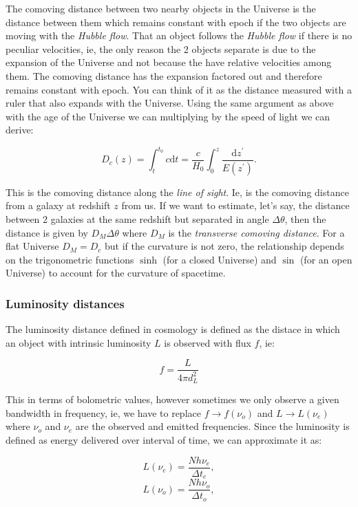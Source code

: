 \documentclass[
  letterpaper,
  DIV=11,
  numbers=noendperiod]{scrreprt}
\begin{document}
The comoving distance between two nearby objects in the Universe is the
distance between them which remains constant with epoch if the two
objects are moving with the \emph{Hubble flow}. That an object follows
the \emph{Hubble flow} if there is no peculiar velocities, ie, the only
reason the 2 objects separate is due to the expansion of the Universe
and not because the have relative velocities among them. The comoving
distance has the expansion factored out and therefore remains constant
with epoch. You can think of it as the distance measured with a ruler
that also expands with the Universe. Using the same argument as above
with the age of the Universe we can multiplying by the speed of light we
can derive:

\[D_c(z) = \int_{t}^{t_0} c\mathrm{ d} t = \frac{c}{H_0} \int^z_0 \frac{\mathrm{ d}z^\prime}{E(z^\prime)}.\]

This is the comoving distance along the \emph{line of sight}. Ie, is the
comoving distance from a galaxy at redshift \(z\) from us. If we want to
estimate, let's say, the distance between 2 galaxies at the same
redshift but separated in angle \(\Delta \theta\), then the distance is
given by \(D_M \Delta \theta\) where \(D_M\) is the \emph{transverse
comoving distance}. For a flat Universe \(D_M = D_c\) but if the
curvature is not zero, the relationship depends on the trigonometric
functions \(\sinh\) (for a closed Universe) and \(\sin\) (for an open
Universe) to account for the curvature of spacetime.

\subsubsection*{Luminosity distances}\label{luminosity-distances}

The luminosity distance defined in cosmology is defined as the distace
in which an object with intrinsic luminosity \(L\) is observed with flux
\(f\), ie:

\[ f = \frac{L}{4\pi d_L^2}\]

This in terms of bolometric values, however sometimes we only observe a
given bandwidth in frequency, ie, we have to replace
\(f\rightarrow f(\nu_o)\) and \(L \rightarrow L(\nu_{e})\) where
\(\nu_o\) and \(\nu_e\) are the observed and emitted frequencies. Since
the luminosity is defined as energy delivered over interval of time, we
can approximate it as:

\[ L(\nu_e) = \frac{Nh\nu_e}{\Delta t_e},\]
\[ L(\nu_o) = \frac{Nh\nu_o}{\Delta t_o},\]
\end{document}
